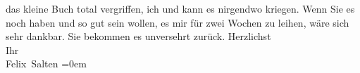 \begin{ledgroupsized}[t]{13cm}
               das kleine Buch total vergriffen, ich \label{K_L03586-3v}\label{K_L03586-3h} und kann es
               nirgendwo kriegen. Wenn Sie es noch haben und so gut sein wollen, es mir für zwei
               Wochen zu leihen, wäre sich sehr dankbar. Sie bekommen es unversehrt zurück. \pend
           \pstart
           Herzlichst
               {\\[\baselineskip]}Ihr
               {\\[\baselineskip]}\spacefill\mbox{Felix Salten}\pend
           \leftskip=0em{}
         
         \endnumbering{}\end{ledgroupsized}\begin{anhang}\end{anhang}\newcommand{\dateiname}{L03586}\newcommand{\titel}{Felix Salten an Arthur Schnitzler, 11. 4. 1928}\newcommand{\editorInnen}{Martin Anton Müller und Laura Untner}
      